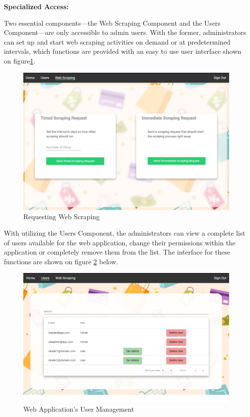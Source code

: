 \noindent\textbf{Specialized Access:}

Two essential components—the Web Scraping Component and the Users Component—are only accessible to admin users. With the former, administrators can set up and start web scraping activities on demand or at predetermined intervals, which functions are provided with an easy to use user interface shown on figure\ref{fig:webcrapingreq}.
\begin{figure}[H]
	\centering
	\includegraphics[width=0.9\linewidth]{img/scraping_web_ss.png}
	\caption{Requesting Web Scraping}
	\label{fig:webcrapingreq}
\end{figure}

\newpage

With utilizing the Users Component, the administrators can view a complete list of users available for the web application, change their permissions within the application or completely remove them from the list. The interface for these functions are shown on figure \ref{fig:umgmt} below.

\begin{figure}[H]
	\centering
	\includegraphics[width=0.8\linewidth]{img/users_ss.png}
	\caption{Web Application's User Management}
	\label{fig:umgmt}
\end{figure}

